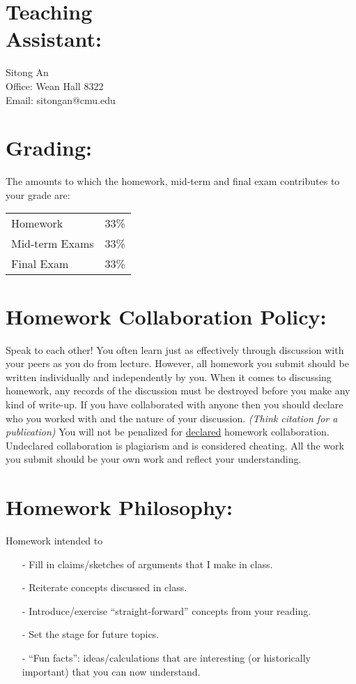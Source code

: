 \documentclass[margin,line]{res}
\begin{document}
\begin{resume}
\section{Teaching\\ Assistant:}
Sitong An \\
Office: Wean Hall 8322\\
Email: sitongan@cmu.edu

\section{Grading:} 
The amounts to which the homework, mid-term and final exam contributes to your grade are:
\begin{center}
\begin{tabular}{lc}
Homework & 33\%\\
Mid-term Exams & 33\%\\
Final Exam & 33\%\\
\end{tabular}
\end{center}

\section{Homework Collaboration Policy:} 

Speak to each other!
You often learn just as effectively through discussion with your peers as you do from lecture. 
However, all homework you submit should be written individually and independently by you.
When it comes to discussing homework, any records of the discussion must be destroyed before you make any kind of write-up. 
If you have collaborated with anyone then you should declare who you worked with and the nature of your discussion. 
\textit{(Think citation for a publication)}
You will not be penalized for \underline{declared} homework collaboration. 
Undeclared collaboration is plagiarism and is considered cheating. 
All the work you submit should be your own work and reflect your understanding.


\section{Homework Philosophy:}

Homework intended to
\begin{itemize}
\item[-] Fill in claims/sketches of arguments that I make in class.
\item[-] Reiterate concepts discussed in class.
\item[-] Introduce/exercise ``straight-forward'' concepts from your reading. 
\item[-] Set the stage for future topics.
\item[-] ``Fun facts'': ideas/calculations that are interesting (or historically important) that you can now understand.
\end{itemize}


\end{resume}
\end{document}
